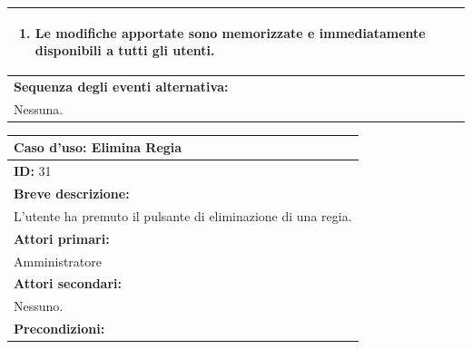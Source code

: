 \documentclass{article}
\begin{document}
\begin{table}[H]
\begin{tabular}{|p{\linewidth}|}
\begin{minipage}{\linewidth}
\begin{enumerate}
                                \item Le modifiche apportate sono memorizzate e immediatamente disponibili a tutti gli utenti.
                            \end{enumerate}
                        \end{minipage} \\
                        \hline
                        \textbf{Sequenza degli eventi alternativa:} \\
                        Nessuna. \\
                        \hline
                    \end{tabular}
                \end{table}

                \begin{table}[H]
                    \begin{tabular}{|p{\linewidth}|}
                        \hline
                        \cellcolor{gray!100}
                        \color{white}
                        \centerline{\textbf{Caso d'uso:} Elimina Regia} \\
                        \hline
                        \textbf{ID:} 31 \\
                        \hline
                        \cellcolor{gray!20}
                        \textbf{Breve descrizione:} \\
                        \cellcolor{gray!20}
                        L'utente ha premuto il pulsante di eliminazione di una regia. \\
                        \hline
                        \textbf{Attori primari:} \\
                        \begin{minipage}{\linewidth}
                            Amministratore
                        \end{minipage}
                        \vspace{-10pt} \\ %
                        \hline
                        \textbf{Attori secondari:} \\
                        Nessuno. \\
                        \hline
                        \cellcolor{gray!20}
                        \textbf{Precondizioni:} \\

\end{tabular}
\end{table}
\end{document}
